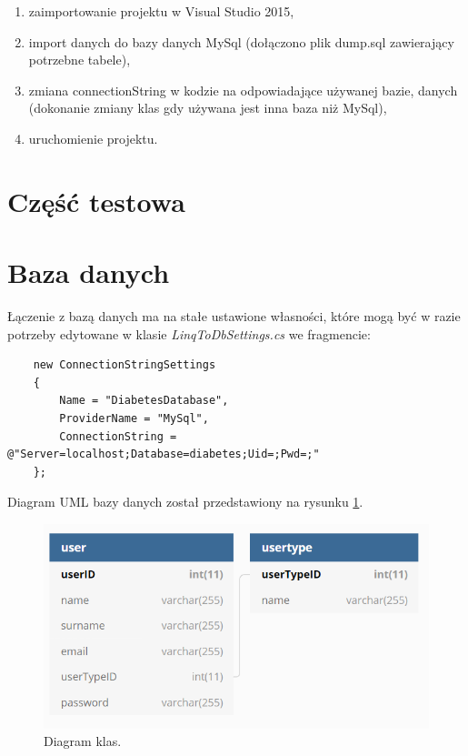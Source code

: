 \documentclass[12pt,a4paper]{article}
\begin{document}
	\begin{enumerate}
		\item zaimportowanie projektu w Visual Studio 2015,
		\item import danych do bazy danych MySql (dołączono plik dump.sql zawierający potrzebne tabele),
		\item zmiana connectionString w kodzie na odpowiadające używanej bazie,
		danych (dokonanie zmiany klas gdy używana jest inna baza niż MySql),
		\item uruchomienie projektu.
	\end{enumerate}
	
\section*{Część testowa}


	
\section*{Baza danych}
Łączenie z bazą danych ma na stałe ustawione własności, które mogą być w razie potrzeby edytowane w klasie \emph{LinqToDbSettings.cs} we fragmencie:
	\begin{lstlisting}
	new ConnectionStringSettings
	{
		Name = "DiabetesDatabase",
		ProviderName = "MySql",
		ConnectionString = @"Server=localhost;Database=diabetes;Uid=;Pwd=;"
	};
	\end{lstlisting}


Diagram UML bazy danych został przedstawiony na rysunku \ref{fig:dbdiagram}.


\begin{figure}[h]
	\centering
	\centerline{
	\includegraphics[width=0.9\linewidth]{media/dbdiagram}
	}
	\caption{Diagram klas.}
	\label{fig:dbdiagram}
\end{figure}
\end{document}
